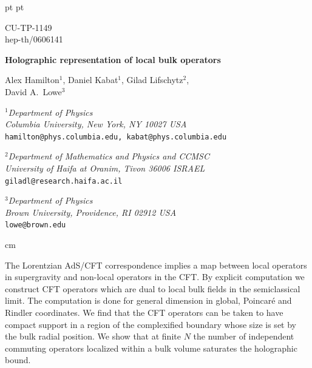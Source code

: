 \documentclass[12pt]{article}
\begin{document}
 pt
 pt

\begin{titlepage}
\begin{flushright}
{\small CU-TP-1149} \\
{\small hep-th/0606141}
\end{flushright}

\begin{center}

\vspace{2mm}

{\Large \bf Holographic representation of local bulk operators}

\vspace{3mm}

Alex Hamilton${}^1$, Daniel Kabat${}^1$, Gilad Lifschytz${}^2$, \\
David A.\ Lowe${}^3$ \\

\vspace{2mm}

${}^1${\small \sl Department of Physics} \\
{\small \sl Columbia University, New York, NY 10027 USA} \\
{\small \tt hamilton@phys.columbia.edu, kabat@phys.columbia.edu}
\vspace{1mm}

${}^2${\small \sl Department of Mathematics and Physics and CCMSC} \\
{\small \sl University of Haifa at Oranim, Tivon 36006 ISRAEL} \\
{\small \tt giladl@research.haifa.ac.il}
\vspace{1mm}

${}^3${\small \sl Department of Physics} \\
{\small \sl Brown University, Providence, RI 02912 USA} \\
{\small \tt lowe@brown.edu}

\end{center}

 cm

\noindent
The Lorentzian AdS/CFT correspondence implies a map between local
operators in supergravity and non-local operators in the CFT.  By
explicit computation we construct CFT operators which are dual to
local bulk fields in the semiclassical limit.  The computation is done
for general dimension in global, Poincar\'e and Rindler coordinates.
We find that the CFT operators can be taken to have compact support in
a region of the complexified boundary whose size is set by the bulk
radial position.  We show that at finite $N$ the number of independent
commuting operators localized within a bulk volume saturates the
holographic bound.

\end{titlepage}
\end{document}
